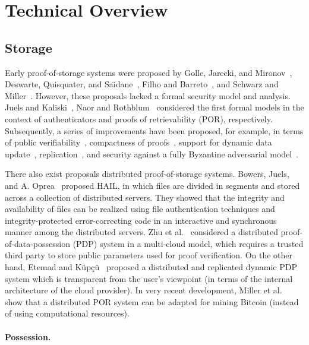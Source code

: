 \section{Technical Overview} \label{sect:techniques}

\subsection{Storage}

Early proof-of-storage systems were proposed by Golle, Jarecki, and Mironov~\cite{GJM02}, Deswarte, Quisquater, and Sa\"{\i}dane~\cite{DQS03}, Filho and Barreto~\cite{FB06}, and Schwarz and Miller~\cite{SM06}.
However, these proposals lacked a formal security model and analysis.
Juels and Kaliski~\cite{JK07}, Naor and Rothblum~\cite{NR09} considered the first formal models in the context of authenticators and proofs of retrievability (POR), respectively.
Subsequently, a series of improvements have been proposed, for example, in terms of public verifiability~\cite{AKK09,ABC+11}, compactness of proofs~\cite{SW13}, support for dynamic data update~\cite{ADM+08,EKP+09,WWL+09,SDJ+12,CKW13,SSP13}, replication~\cite{CKB+08}, and security against a fully Byzantine adversarial model~\cite{BJO09a}.

There also exist proposals distributed proof-of-storage systems.
Bowers, Juels, and A. Oprea~\cite{BJO09b} proposed HAIL, in which files are divided in segments and stored across a collection of distributed servers.
They showed that the integrity and availability of files can be realized using file authentication techniques and integrity-protected error-correcting code in an interactive and synchronous manner among the distributed servers.
Zhu et al.~\cite{ZHA+12} considered a distributed proof-of-data-possession (PDP) system in a multi-cloud model, which requires a trusted third party to store public parameters used for proof verification.
On the other hand, Etemad and K{\"u}p\c{c}{\"u}~\cite{EK13} proposed a distributed and replicated dynamic PDP system which is transparent from the user's viewpoint (in terms of the internal architecture of the cloud provider).
In very recent development, Miller et al.~\cite{MJS+14} show that a distributed POR system can be adapted for mining Bitcoin (instead of using computational resources).

\paragraph{Possession.}

